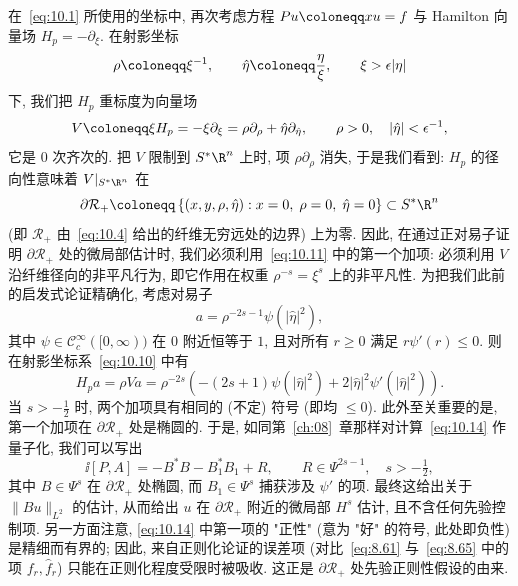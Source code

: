 在~\eqref{eq:10.1} 所使用的坐标中, 再次考虑方程 $P u \defeq x u = f$ 与 Hamilton 向量场 $H_p = -\partial_\xi$. 在射影坐标
\begin{equation}\label{eq:10.10}
    \rho \defeq \xi^{-1}, \qquad \hat{\eta} \defeq \frac{\eta}{\xi}, \qquad \xi > \epsilon |\eta|
\end{equation}
下, 我们把 $H_p$ 重标度为向量场
\begin{equation}\label{eq:10.11}
    V \defeq \xi H_p = -\xi \partial_\xi = \rho \partial_\rho + \hat{\eta} \partial_{\hat{\eta}}, \qquad \rho > 0, \quad |\hat{\eta}| < \epsilon^{-1},
\end{equation}
它是 0 次齐次的. 把 $V$ 限制到 $S^* \R^n$ 上时, 项 $\rho \partial_\rho$ 消失, 于是我们看到: $H_p$ 的径向性意味着 $V|_{S^* \R^n}$ 在
\begin{equation}\label{eq:10.12}
    \partial \mathcal{R}_+ \defeq \left\{ (x, y, \rho, \hat{\eta}) : x = 0, \; \rho = 0, \; \hat{\eta} = 0 \right\} \subset S^* \R^n
\end{equation}
(即 $\mathcal{R}_+$ 由~\eqref{eq:10.4} 给出的纤维无穷远处的边界) 上为零. 因此, 在通过正对易子证明 $\partial\mathcal{R}_+$ 处的微局部估计时, 我们必须利用~\eqref{eq:10.11} 中的第一个加项: 必须利用 $V$ 沿纤维径向的非平凡行为, 即它作用在权重 $\rho^{-s} = \xi^s$ 上的非平凡性. 为把我们此前的启发式论证精确化, 考虑对易子
\begin{equation}\label{eq:10.13}
    a = \rho^{-2s-1} \psi(|\hat{\eta}|^2),
\end{equation}
其中 $\psi \in \mathcal{C}_c^\infty([0, \infty))$ 在 $0$ 附近恒等于 $1$, 且对所有 $r \ge 0$ 满足 $r \psi'(r) \le 0$. 则在射影坐标系~\eqref{eq:10.10} 中有
\begin{equation}\label{eq:10.14}
    H_p a = \rho V a = \rho^{-2s} \left( -(2s + 1) \psi(|\hat{\eta}|^2) + 2|\hat{\eta}|^2 \psi'(|\hat{\eta}|^2) \right).
\end{equation}
当 $s > -\frac{1}{2}$ 时, 两个加项具有相同的 (不定) 符号 (即均 $\le 0$). 此外至关重要的是, 第一个加项在 $\partial\mathcal{R}_+$ 处是椭圆的. 于是, 如同第~\ref{ch:08}~章那样对计算~\eqref{eq:10.14} 作量子化, 我们可以写出
\begin{equation}\label{eq:10.15}
    \ii [P, A] = -B^* B - B_1^* B_1 + R, \qquad R \in \Psi^{2s-1}, \quad s > -\tfrac{1}{2},
\end{equation}
其中 $B \in \Psi^s$ 在 $\partial\mathcal{R}_+$ 处椭圆, 而 $B_1 \in \Psi^s$ 捕获涉及 $\psi'$ 的项. 最终这给出关于 $\|B u\|_{L^2}$ 的估计, 从而给出 $u$ 在 $\partial\mathcal{R}_+$ 附近的微局部 $H^s$ 估计, 且不含任何先验控制项. 另一方面注意, \eqref{eq:10.14} 中第一项的 "正性" (意为 "好" 的符号, 此处即负性) 是精细而有界的; 因此, 来自正则化论证的误差项 (对比~\eqref{eq:8.61} 与~\eqref{eq:8.65} 中的项 $f_r, \hat{f}_r$) 只能在正则化程度受限时被吸收. 这正是 $\partial\mathcal{R}_+$ 处先验正则性假设的由来.

